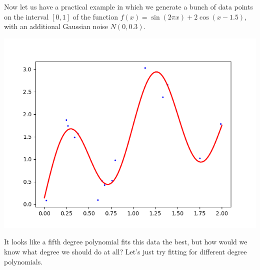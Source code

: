 \documentclass{article}
\theoremstyle{definition}
\begin{document}
    Now let us have a practical example in which we generate a bunch of data points on the interval $[0, 1]$ of the function $f(x) = \sin(2\pi x) + 2\cos (x - 1.5)$, with an additional Gaussian noise $N(0, 0.3)$. 
    \begin{center}
        \includegraphics[scale=0.4]{polynomial_first/True_data.png}
    \end{center}
    It looks like a fifth degree polynomial fits this data the best, but how would we know what degree we should do at all? Let's just try fitting for different degree polynomials. 
\end{document}

